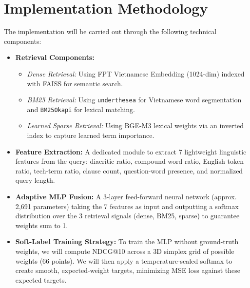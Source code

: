 \documentclass[11pt,a4paper]{article}
\begin{document}
\section{Implementation Methodology}
The implementation will be carried out through the following technical components:
\begin{itemize}[leftmargin=*]
    \item \textbf{Retrieval Components:}
    \begin{itemize}
        \item \emph{Dense Retrieval:} Using FPT Vietnamese Embedding (1024-dim) indexed with FAISS for semantic search.
        \item \emph{BM25 Retrieval:} Using \texttt{underthesea} for Vietnamese word segmentation and \texttt{BM25Okapi} for lexical matching.
        \item \emph{Learned Sparse Retrieval:} Using BGE-M3 lexical weights via an inverted index to capture learned term importance.
    \end{itemize}
    \item \textbf{Feature Extraction:} A dedicated module to extract 7 lightweight linguistic features from the query: diacritic ratio, compound word ratio, English token ratio, tech-term ratio, clause count, question-word presence, and normalized query length.
    \item \textbf{Adaptive MLP Fusion:} A 3-layer feed-forward neural network (approx. 2,691 parameters) taking the 7 features as input and outputting a softmax distribution over the 3 retrieval signals (dense, BM25, sparse) to guarantee weights sum to 1.
    \item \textbf{Soft-Label Training Strategy:} To train the MLP without ground-truth weights, we will compute NDCG@10 across a 3D simplex grid of possible weights (66 points). We will then apply a temperature-scaled softmax to create smooth, expected-weight targets, minimizing MSE loss against these expected targets.
\end{itemize}
\end{document}
